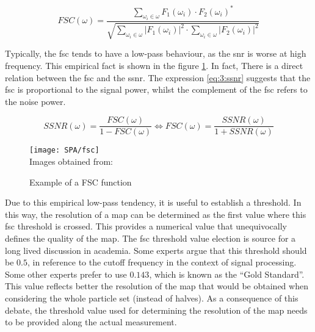 \documentclass[../main.tex]{subfiles}
\begin{document}
\begin{equation}\label{eq:3:fsc}
    FSC(\omega) =   \frac{
                        \sum_{\omega_i \in \omega} F_1(\omega_i) \cdot F_2(\omega_i)^*
                    }{
                        \sqrt{\sum_{\omega_i \in \omega} |F_1(\omega_i)|^2 \cdot \sum_{\omega_i \in \omega} |F_2(\omega_i)|^2}
                    }
\end{equation}

Typically, the \gls{fsc} tends to have a low-pass behaviour, as the \gls{snr} is worse at high frequency. This empirical fact is shown in the figure \ref{fig:3:fsc}.  In fact, There is a direct relation between the \gls{fsc} and the \gls{ssnr}. The expression \eqref{eq:3:ssnr} suggests that the \gls{fsc} is proportional to the signal power, whilst the complement of the \gls{fsc} refers to the noise power.

\begin{equation}\label{eq:3:ssnr}
    SSNR(\omega) = \frac{FSC(\omega)}{1 - FSC(\omega)} \Leftrightarrow FSC(\omega) = \frac{SSNR(\omega)}{1 + SSNR(\omega)}
\end{equation}

\begin{figure}[h]
    \centering
    \texttt{[image: SPA/fsc]}\\
    Images obtained from: \cite{dubach2020}
    \caption{Example of a FSC function}
    \label{fig:3:fsc}
\end{figure}

Due to this empirical low-pass tendency, it is useful to establish a threshold. In this way, the resolution of a map can be determined as the first value where this \gls{fsc} threshold is crossed. This provides a numerical value that unequivocally defines the quality of the map. The \gls{fsc} threshold value election is source for a long lived discussion in academia. Some experts argue that this threshold should be $0.5$, in reference to the cutoff frequency in the context of signal processing. Some other experts prefer to use $0.143$, which is known as the ``Gold Standard''. This value reflects better the resolution of the map that would be obtained when considering the whole particle set (instead of halves)\cite{chen2013}. As a consequence of this debate, the threshold value used for determining the resolution of the map needs to be provided along the actual measurement.
\end{document}
